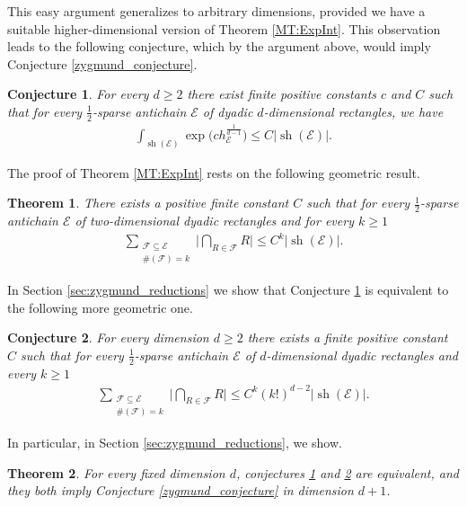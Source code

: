 \documentclass[oneside]{amsart}
\newtheorem{theorem}{Theorem}
\newtheorem{conjecture}{Conjecture}
\theoremstyle{definition}
\theoremstyle{plain}
\numberwithin{equation}{section}
\numberwithin{theorem}{section}
\newcommand{\sh}{\operatorname{sh}}
\begin{document}
This easy argument generalizes to arbitrary dimensions, provided we have a
suitable higher-dimensional version of Theorem
\ref{MT:ExpInt}. This observation leads to the
following conjecture, which by the argument above, would imply Conjecture
\ref{zygmund_conjecture}.
\begin{conjecture} \label{conjecture:antichain_exp_int}
  For every $d \geq 2$ there exist finite positive constants $c$ and $C$ such
  that for every $\frac{1}{2}$-sparse antichain $\mathcal{E}$ of dyadic
  $d$-dimensional rectangles, we have
  \begin{align*}
    \int_{\sh(\mathcal{E})} \exp\Big(c h_{\mathcal{E}}^{\frac{1}{d-1}}\Big)
    \leq C|\sh(\mathcal{E})|.
  \end{align*}
\end{conjecture}

The proof of Theorem \ref{MT:ExpInt} rests on the following geometric result.
\begin{theorem}
  \label{MT:kwise}
  There exists a positive finite constant $C$ such that
  for every $\frac{1}{2}$-sparse antichain $\mathcal{E}$ of two-dimensional
  dyadic rectangles and for every $k \geq 1$
  \begin{align*}
    \sum_{\substack{\mathcal{F} \subseteq \mathcal{E} \\
      \#(\mathcal{F}) = k
    }} \Big|
      \bigcap_{R \in \mathcal{F}} R
    \Big|
    \leq C^k |\sh(\mathcal{E})|.
  \end{align*}
\end{theorem}
In Section \ref{sec:zygmund_reductions} we show that Conjecture
\ref{conjecture:antichain_exp_int} is equivalent to the following more geometric
one.
\begin{conjecture} \label{conjecture:kwise}
  For every dimension $d \geq 2$ there exists a finite positive constant $C$
  such that
  for every $\frac{1}{2}$-sparse antichain $\mathcal{E}$ of $d$-dimensional
  dyadic rectangles and every $k \geq 1$
  \begin{align*}
    \sum_{\substack{\mathcal{F} \subseteq \mathcal{E} \\
      \#(\mathcal{F}) = k
    }} \Big|
      \bigcap_{R \in \mathcal{F}} R
    \Big|
    \leq C^k (k!)^{d-2} |\sh(\mathcal{E})|.
  \end{align*}
\end{conjecture}

In particular, in Section \ref{sec:zygmund_reductions}, we show.
\begin{theorem} \label{conjectures_equivalent}
  For every fixed dimension $d$, conjectures \ref{conjecture:antichain_exp_int}
  and \ref{conjecture:kwise} are equivalent, and they both imply Conjecture
  \ref{zygmund_conjecture} in dimension $d+1$.
\end{theorem}
\end{document}
